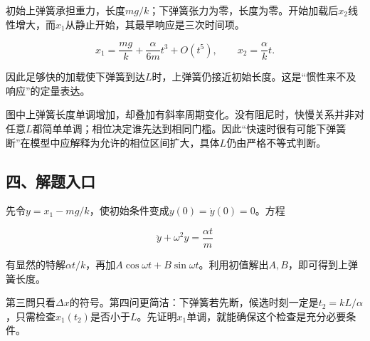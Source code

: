 \documentclass[12pt,a4paper,fontset=fandol]{ctexart}
\begin{document}
初始上弹簧承担重力，长度\(mg/k\)；下弹簧张力为零，长度为零。开始加载后\(x_2\)线性增大，而\(x_1\)从静止开始，其最早响应是三次时间项。

\[
x_1=\frac{mg}k+\frac{\alpha}{6m}t^3+O(t^5),
\qquad x_2=\frac{\alpha}k t.
\]

因此足够快的加载使下弹簧到达\(L\)时，上弹簧仍接近初始长度。这是``惯性来不及响应''的定量表达。

\begin{center}
\begin{minipage}{\linewidth}
\centering\begingroup{}
\ifdim\wd\diagrambox>.88\linewidth
\sbox{\diagrambox}{\resizebox{.88\linewidth}{!}{\usebox{\diagrambox}}}\fi
\ifdim\ht\diagrambox>.38\textheight
\resizebox{!}{.38\textheight}{\usebox{\diagrambox}}
\else\usebox{\diagrambox}\fi
\par{}\endgroup\end{minipage}\end{center}

图中上弹簧长度单调增加，却叠加有斜率周期变化。没有阻尼时，快慢关系并非对任意\(L\)都简单单调；相位决定谁先达到相同门槛。因此``快速时很有可能下弹簧断''在模型中应解释为允许的相位区间扩大，具体\(L\)仍由严格不等式判断。

\subsection{四、解题入口}\label{ux56dbux89e3ux9898ux5165ux53e3-4}

先令\(y=x_1-mg/k\)，使初始条件变成\(y(0)=\dot y(0)=0\)。方程

\[
\ddot y+\omega^2y=\frac{\alpha t}{m}
\]

有显然的特解\(\alpha t/k\)，再加\(A\cos\omega t+B\sin\omega t\)。利用初值解出\(A,B\)，即可得到上弹簧长度。

第三問只看\(\Delta x\)的符号。第四问更简洁：下弹簧若先断，候选时刻一定是\(t_2=kL/\alpha\)，只需检查\(x_1(t_2)\)是否小于\(L\)。先证明\(x_1\)单调，就能确保这个检查是充分必要条件。
\end{document}

